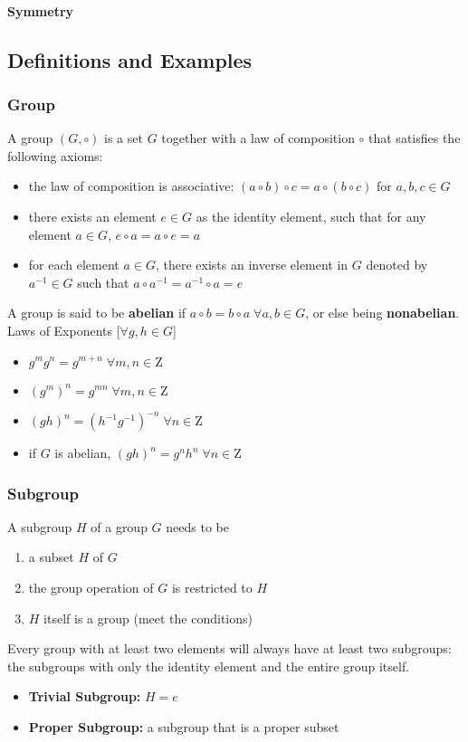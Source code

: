 \documentclass{article}
\begin{document}
\paragraph{Symmetry}
\subsection{Definitions and Examples}
\subsubsection{Group}
A group $(G,\circ)$ is a set $G$ together with a law of composition $\circ$ that satisfies the following axioms:
\begin{itemize}
    \item the law of composition is associative: 
    $(a\circ b)\circ c=a\circ (b\circ c)$ for $a,b,c\in G$
    \item there exists an element $e\in G$ as the identity element, such that for any element $a\in G$, $e\circ a=a\circ e=a$
    \item for each element $a\in G$, there exists an inverse element in $G$ denoted by $a^{-1}\in G$ such that $a\circ a^{-1}=a^{-1}\circ a=e$
\end{itemize}
A group is said to be \textbf{abelian} if $a\circ b=b\circ a \;\forall a,b\in G$, or else being \textbf{nonabelian}.
\\Laws of Exponents [$\forall g,h\in G$]\\
\begin{itemize}
    \item $g^{m}g^{n}=g^{m+n}\;\forall m,n\in \mathrm{Z}$
    \item $(g^m)^n=g^{mn}\;\forall m,n\in \mathrm{Z}$
    \item $(gh)^n=(h^{-1}g^{-1})^{-n}\;\forall n\in \mathrm{Z}$
    \item if $G$ is abelian, $(gh)^n=g^{n}h^{n}\;\forall n\in\mathrm{Z}$
\end{itemize}
\subsubsection{Subgroup}
A subgroup $H$ of a group $G$ needs to be
\begin{enumerate}
    \item a subset $H$ of $G$
    \item the group operation of $G$ is restricted to $H$
    \item $H$ itself is a group (meet the conditions)
\end{enumerate}
Every group with at least two elements will always have at least two subgroups: the subgroups with only the identity element and the entire group itself.
\begin{itemize}
    \item \textbf{Trivial Subgroup:} $H={e}$
    \item \textbf{Proper Subgroup:} a subgroup that is a proper subset
\end{itemize}
\end{document}
